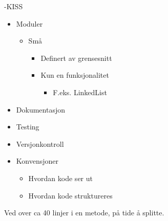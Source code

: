 \documentclass[11pt]{article}
\begin{document}
-KISS
\begin{itemize}
\item Moduler
\begin{itemize}
\item Små
\begin{itemize}
\item Definert av grensesnitt
\item Kun en funksjonalitet
\begin{itemize}
\item F.eks. LinkedList
\end{itemize}
\end{itemize}
\end{itemize}
\item Dokumentasjon
\item Testing
\item Versjonkontroll
\item Konvensjoner
\begin{itemize}
\item Hvordan kode ser ut
\item Hvordan kode struktureres
\end{itemize}
\end{itemize}

Ved over ca 40 linjer i en metode, på tide å splitte.
\end{document}
